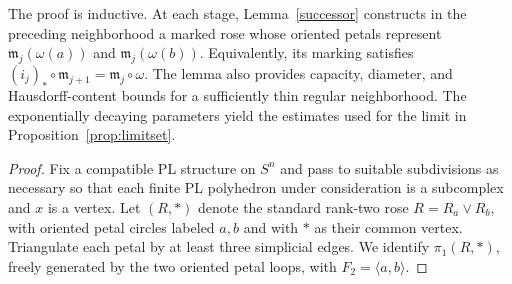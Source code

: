\documentclass[12pt,oneside,a4paper]{article}
\theoremstyle{mytheorem}
\theoremstyle{remark}
\theoremstyle{definition}
\begin{document}
The proof is inductive.  At each stage, Lemma~\ref{successor} constructs
in the preceding neighborhood a marked rose whose oriented petals
represent $\mathfrak{m}_j(\omega(a))$ and $\mathfrak{m}_j(\omega(b))$.
Equivalently, its marking satisfies
$(i_j)_*\circ\mathfrak{m}_{j+1}=\mathfrak{m}_j\circ\omega$.  The lemma also
provides capacity, diameter, and Hausdorff-content bounds for a sufficiently
thin regular neighborhood.
The exponentially decaying parameters yield the estimates used for the
limit in Proposition~\ref{prop:limitset}.


\begin{proof}
Fix a compatible PL structure on $S^n$ and pass to suitable subdivisions
as necessary so that each finite PL polyhedron under consideration is a
subcomplex and $x$ is a vertex.  Let $(R,*)$ denote the standard rank-two
rose $R=R_a\vee R_b$, with oriented petal circles labeled $a,b$ and with
$*$ as their common vertex.  Triangulate each petal by at least three simplicial
edges.  We identify $\pi_1(R,*)$, freely generated by the two oriented
petal loops, with $F_2=\langle a,b\rangle$.


\end{proof}
\end{document}
